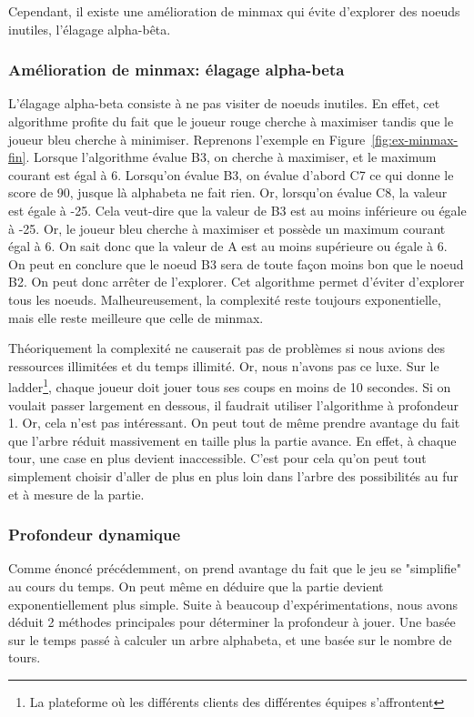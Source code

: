 Cependant, il existe une amélioration de minmax qui évite d'explorer des noeuds inutiles, l'élagage alpha-bêta.


\subsubsection{Amélioration de minmax: élagage alpha-beta}
L'élagage alpha-beta consiste à ne pas visiter de noeuds inutiles. En effet, cet algorithme
profite du fait que le joueur rouge cherche à maximiser tandis que le joueur bleu cherche à minimiser.
Reprenons l'exemple en Figure~\ref{fig:ex-minmax-fin}.
Lorsque l'algorithme évalue B3, on cherche à maximiser, et le maximum courant est égal à 6.
Lorsqu'on évalue B3, on évalue d'abord C7 ce qui donne le score de 90, jusque là alphabeta ne fait rien.
Or, lorsqu'on évalue C8, la valeur est égale à -25. Cela veut-dire que la valeur de B3 est au moins
inférieure ou égale à -25. Or, le joueur bleu cherche à maximiser et possède un maximum courant égal à 6.
On sait donc que la valeur de A est au moins supérieure ou égale à 6. On peut en conclure que le noeud B3 sera de toute façon
moins bon que le noeud B2. On peut donc arrêter de l'explorer. Cet algorithme permet d'éviter d'explorer tous les noeuds. Malheureusement, la complexité
reste toujours exponentielle, mais elle reste meilleure que celle de minmax.

Théoriquement la complexité ne causerait pas de problèmes si nous avions
des ressources illimitées et du temps illimité. Or, nous n'avons pas ce luxe.
Sur le ladder\footnote{La plateforme où les différents clients des différentes équipes s'affrontent},
chaque joueur doit jouer tous ses coups en moins de 10 secondes. Si on voulait passer largement
en dessous, il faudrait utiliser l'algorithme à profondeur 1. Or, cela n'est pas intéressant.
On peut tout de même prendre avantage du fait que l'arbre réduit massivement en taille plus la partie avance.
En effet, à chaque tour, une case en plus devient inaccessible. C'est pour cela
qu'on peut tout simplement choisir d'aller de plus en plus loin dans l'arbre des possibilités 
au fur et à mesure de la partie.

\subsubsection{Profondeur dynamique}
Comme énoncé précédemment, on prend avantage du fait que le jeu
se "simplifie" au cours du temps. On peut même en déduire que la partie
devient exponentiellement plus simple. Suite à beaucoup d'expérimentations,
nous avons déduit 2 méthodes principales pour déterminer la profondeur à jouer.
Une basée sur le temps passé à calculer un arbre alphabeta, et une basée
sur le nombre de tours.

